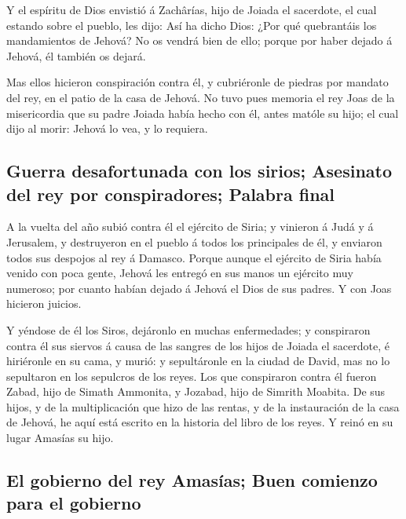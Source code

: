  Y el espíritu de Dios envistió á Zachârías, hijo de
Joiada el sacerdote, el cual estando sobre el pueblo, les dijo: Así ha
dicho Dios: ¿Por qué quebrantáis los mandamientos de Jehová? No os
vendrá bien de ello; porque por haber dejado á Jehová, él también os
dejará.

 Mas ellos hicieron conspiración contra él, y cubriéronle
de piedras por mandato del rey, en el patio de la casa de Jehová.
 No tuvo pues memoria el rey Joas de la misericordia que
su padre Joiada había hecho con él, antes matóle su hijo; el cual dijo
al morir: Jehová lo vea, y lo requiera.

\hypertarget{guerra-desafortunada-con-los-sirios-asesinato-del-rey-por-conspiradores-palabra-final}{%
\subsection{Guerra desafortunada con los sirios; Asesinato del rey por
conspiradores; Palabra
final}\label{guerra-desafortunada-con-los-sirios-asesinato-del-rey-por-conspiradores-palabra-final}}

 A la vuelta del año subió contra él el ejército de
Siria; y vinieron á Judá y á Jerusalem, y destruyeron en el pueblo á
todos los principales de él, y enviaron todos sus despojos al rey á
Damasco.  Porque aunque el ejército de Siria había venido
con poca gente, Jehová les entregó en sus manos un ejército muy
numeroso; por cuanto habían dejado á Jehová el Dios de sus padres. Y con
Joas hicieron juicios.

 Y yéndose de él los Siros, dejáronlo en muchas
enfermedades; y conspiraron contra él sus siervos á causa de las sangres
de los hijos de Joiada el sacerdote, é hiriéronle en su cama, y murió: y
sepultáronle en la ciudad de David, mas no lo sepultaron en los
sepulcros de los reyes.  Los que conspiraron contra él
fueron Zabad, hijo de Simath Ammonita, y Jozabad, hijo de Simrith
Moabita.  De sus hijos, y de la multiplicación que hizo
de las rentas, y de la instauración de la casa de Jehová, he aquí está
escrito en la historia del libro de los reyes. Y reinó en su lugar
Amasías su hijo.

\hypertarget{el-gobierno-del-rey-amasuxedas-buen-comienzo-para-el-gobierno}{%
\subsection{El gobierno del rey Amasías; Buen comienzo para el
gobierno}\label{el-gobierno-del-rey-amasuxedas-buen-comienzo-para-el-gobierno}}

